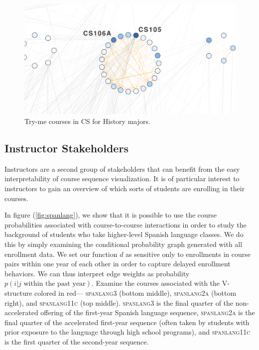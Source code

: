 \documentclass{sigchi}
\begin{document}
\begin{figure}[h]
    \centering
    \includegraphics[width=.9\columnwidth]{final-history-try-me.pdf}
    \caption{Try-me courses in CS for History majors.}
    \label{fig:history-try-me}
\end{figure}

\subsection{Instructor Stakeholders}
\label{sec:instructor_stakeholders}

Instructors are a second group of stakeholders that can benefit from the easy interpretability of course sequence visualization. It is of particular interest to instructors to gain an overview of which sorts of students are enrolling in their courses. 

In figure (\ref{fig:spanlang}), we show that it is possible to use the course probabilities associated with course-to-course interactions in order to study the background of students who take higher-level Spanish language classes. We do this by simply examining the conditional probability graph generated with all enrollment data. We set our function $d$ as sensitive only to enrollments in course pairs within one year of each other in order to capture delayed enrollment behaviors. We can thus interpret edge weights as probability $p(i|j \text{ within the past year})$. Examine the courses associated with the V-structure colored in red--- \textsc{spanlang3} (bottom middle), \textsc{spanlang2a} (bottom right), and \textsc{spanlang11c} (top middle). \textsc{spanlang3} is the final quarter of the non-accelerated offering of the first-year Spanish language sequence, \textsc{spanlang2a} is the final quarter of the accelerated first-year sequence (often taken by students with prior exposure to the language through high school programs), and \textsc{spanlang11c} is the first quarter of the second-year sequence.
\end{document}
